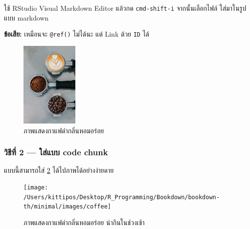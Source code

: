 \documentclass[
]{article}
\begin{document}
ใช้ RStudio Visual Markdown Editor แล้วกด \texttt{cmd-shift-i} จากนั้นเลือกไฟล์ ใส่มาในรูปแบบ markdown

\textbf{ข้อเสีย:} เหมือนจะ \texttt{@ref()} ไม่ได้นะ แต่ Link ด้วย \texttt{ID} ได้

\begin{figure}
\hypertarget{coffee}{%
\centering
\includegraphics[width=0.25\textwidth,height=\textheight]{images/coffee.jpg}
\caption{ภาพแสดงกาแฟดำกลิ่นหอมอร่อย}\label{coffee}
}
\end{figure}

\hypertarget{image-method2}{%
\subsubsection{วิธีที่ 2 --- ใส่แบบ code chunk}\label{image-method2}}

แบบนี้สามารถใส่ \texttt{\ref{fig:img-coffee}} ได้ไปภาพได้อย่างง่ายดาย



\begin{figure}

{\centering \texttt{[image: /Users/kittipos/Desktop/R\_Programming/Bookdown/bookdown-th/minimal/images/coffee]} 

}

\caption{ภาพแสดงกาแฟดำกลิ่นหอมอร่อย น่ากินในช่วงเช้า}\label{fig:img-coffee}
\end{figure}
\end{document}

